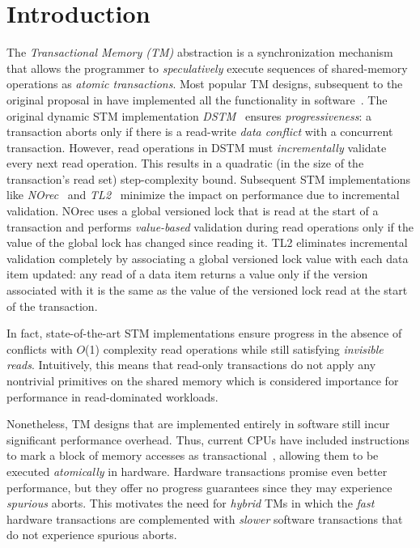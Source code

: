 \section{Introduction}
\label{sec:intro}
%
%
The \emph{Transactional Memory (TM)} abstraction is a synchronization mechanism 
that allows the programmer to \emph{speculatively} execute sequences of shared-memory
operations as \emph{atomic transactions}.
Most popular TM designs, subsequent to the original proposal in \cite{HM93} 
have implemented all the functionality in software~\cite{norec, ST95,HLM+03, astm, fraser}.
The original dynamic STM implementation \emph{DSTM}~\cite{HLM+03} ensures \emph{progressiveness}: 
a transaction aborts only if there is a read-write \emph{data conflict} with a concurrent
transaction. However, read operations in DSTM must \emph{incrementally} validate
every next read operation. This results in a quadratic  (in the size of the transaction's read
set) step-complexity bound. Subsequent STM 
implementations like \emph{NOrec}~\cite{norec} and \emph{TL2}~\cite{DSS06}
minimize the impact on performance due to incremental validation.
NOrec uses a global versioned lock that is read at the start of a transaction and performs \emph{value-based}
validation during read operations only if the value of the global lock has changed since reading it.
TL2 eliminates incremental validation completely by associating a global versioned lock
value with each data item updated: any read of a data item returns
a value only if the version associated with it is the same as the 
value of the versioned lock read at the start of the transaction. 

In fact, state-of-the-art STM implementations ensure progress in the absence of conflicts with 
$O$(1) complexity read operations while still satisfying \emph{invisible reads}.
Intuitively, this means that read-only transactions do not
apply any nontrivial primitives on the shared memory which is considered importance for performance in
read-dominated workloads.

Nonetheless, TM designs that are implemented entirely in software still incur significant performance overhead.
Thus, current CPUs have included instructions to mark a block of memory accesses as transactional~\cite{Rei12, asf, bluegene}, allowing them to be executed \emph{atomically} in hardware.
Hardware transactions promise even better performance, but they offer no progress guarantees 
since they may experience %
\emph{spurious} aborts. This motivates the need for
\emph{hybrid} TMs in which the \emph{fast} hardware transactions are 
complemented with \emph{slower} software transactions that do not experience spurious aborts.

